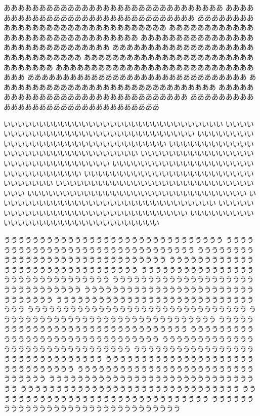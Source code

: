 \begin{breakLRline}[sensyu=\protect\emcdottedline,fboxsep=10pt]
%
あああああああああああああああああああああああああああああああ
あああああああああああああああああああああああああああああああ
あああああああああああああああああああああああああああああああ
あああああああああああああああああああああああああああああああ
あああああああああああああああああああああああああああああああ
あああああああああああああああああああああああああああああああ
あああああああああああああああああああああああああああああああ
あああああああああああああああああああああああああああああああ
あああああああああああああああああああああああああああああああ
あああああああああああああああああああああああああああああああ
あああああああああああああああああああああああああああああああ
あああああああああああああああああああああああああああああああ

いいいいいいいいいいいいいいいいいいいいいいいいいいいいいいい
いいいいいいいいいいいいいいいいいいいいいいいいいいいいいいい
いいいいいいいいいいいいいいいいいいいいいいいいいいいいいいい
いいいいいいいいいいいいいいいいいいいいいいいいいいいいいいい
いいいいいいいいいいいいいいいいいいいいいいいいいいいいいいい
いいいいいいいいいいいいいいいいいいいいいいいいいいいいいいい
いいいいいいいいいいいいいいいいいいいいいいいいいいいいいいい
いいいいいいいいいいいいいいいいいいいいいいいいいいいいいいい
いいいいいいいいいいいいいいいいいいいいいいいいいいいいいいい
いいいいいいいいいいいいいいいいいいいいいいいいいいいいいいい
いいいいいいいいいいいいいいいいいいいいいいいいいいいいいいい
いいいいいいいいいいいいいいいいいいいいいいいいいいいいいいい

ううううううううううううううううううううううううううううううう
ううううううううううううううううううううううううううううううう
ううううううううううううううううううううううううううううううう
ううううううううううううううううううううううううううううううう
ううううううううううううううううううううううううううううううう
ううううううううううううううううううううううううううううううう
ううううううううううううううううううううううううううううううう
ううううううううううううううううううううううううううううううう
ううううううううううううううううううううううううううううううう
ううううううううううううううううううううううううううううううう
ううううううううううううううううううううううううううううううう
ううううううううううううううううううううううううううううううう
ううううううううううううううううううううううううううううううう
ううううううううううううううううううううううううううううううう
ううううううううううううううううううううううううううううううう
ううううううううううううううううううううううううううううううう
ううううううううううううううううううううううううううううううう
ううううううううううううううううううううううううううううううう
ううううううううううううううううううううううううううううううう
ううううううううううううううううううううううううううううううう
\end{breakLRline}
